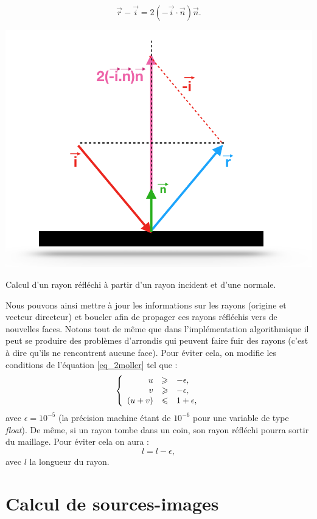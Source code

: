 \begin{equation}
\overrightarrow{r} - \overrightarrow{i} = 2(-\overrightarrow{i}\cdot \overrightarrow{n})\overrightarrow{n}.
\end{equation}

\begin{figureth}
	\includegraphics[width=0.6\linewidth]{images/rayRefl}
	\caption{Calcul d'un rayon réfléchi à partir d'un rayon incident et d'une normale.}
	\label{rayRefl}
\end{figureth}

Nous pouvons ainsi mettre à jour les informations sur les rayons (origine et vecteur directeur) et boucler afin de propager ces rayons réfléchis vers de nouvelles faces. Notons tout de même que dans l'implémentation algorithmique il peut se produire des problèmes d'arrondis qui peuvent faire fuir des rayons (c'est à dire qu'ils ne rencontrent aucune face). Pour éviter cela, on modifie les conditions de l'équation \ref{eq_2moller} tel que :
\begin{equation}
   \left \{
   \begin{array}{r c l}
u & \geqslant & -\epsilon,  \\
v & \geqslant & -\epsilon,  \\
(u+v) & \leqslant & 1+\epsilon,
   \end{array}
   \right .
\end{equation}
avec $\epsilon = 10^{-5}$ (la précision machine étant de $10^{-6}$ pour une variable de type \textit{float}). De même, si un rayon tombe dans un coin, son rayon réfléchi pourra sortir du maillage. Pour éviter cela on aura :
\begin{equation*}
l = l- \epsilon,
\end{equation*}
avec $l$ la longueur du rayon.




\section{Calcul de sources-images} \label{sect_si}


